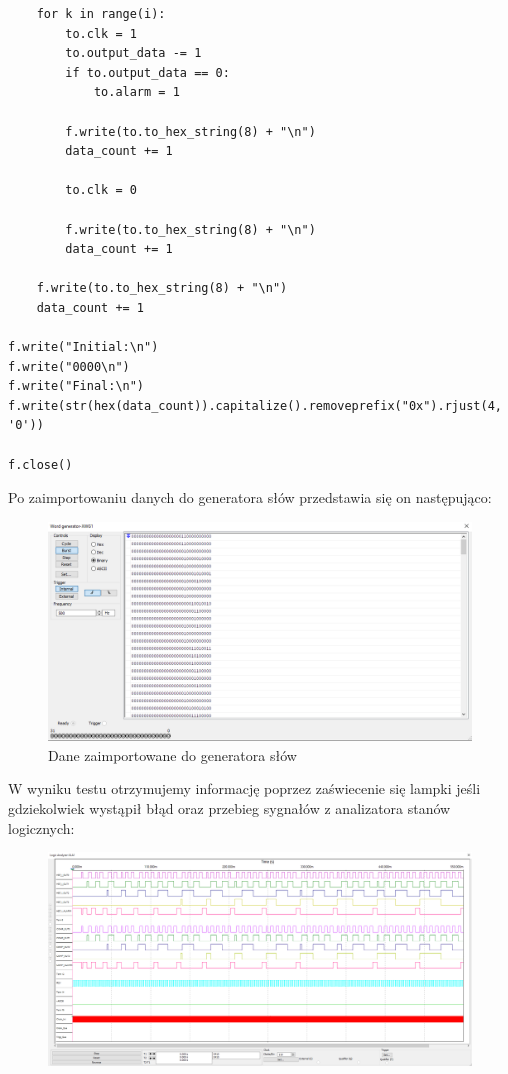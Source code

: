\documentclass[a4paper]{article}
\begin{document}
\begin{verbatim}
    for k in range(i):
        to.clk = 1
        to.output_data -= 1
        if to.output_data == 0:
            to.alarm = 1

        f.write(to.to_hex_string(8) + "\n")
        data_count += 1

        to.clk = 0

        f.write(to.to_hex_string(8) + "\n")
        data_count += 1

    f.write(to.to_hex_string(8) + "\n")
    data_count += 1

f.write("Initial:\n")
f.write("0000\n")
f.write("Final:\n")
f.write(str(hex(data_count)).capitalize().removeprefix("0x").rjust(4, '0'))

f.close()
\end{verbatim}
\Large

\pagebreak
Po zaimportowaniu danych do generatora słów przedstawia się on następująco:
\begin{figure}[H]
    \centering

    \includegraphics{general_test_word_generator.png}
    \caption{Dane zaimportowane do generatora słów}
\end{figure}

\pagebreak
W wyniku testu otrzymujemy informację poprzez zaświecenie się lampki jeśli gdziekolwiek wystąpił błąd oraz 
przebieg sygnałów z analizatora stanów logicznych:
\begin{figure}[H]
    \centering
    \includegraphics[width=\textwidth]{general_test_logic_analyzer.png}
\end{figure}
\pagebreak
\end{document}
